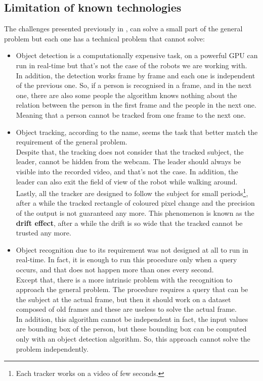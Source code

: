 \subsection{Limitation of known technologies}
The challenges presented previously in , can solve a small part of the general problem but each one has a technical problem that cannot solve:
\begin{itemize}
	\item Object detection is a computationally expensive task, on a powerful GPU can run in real-time but that's not the case of the robots we are working with.\\
	In addition, the detection works frame by frame and each one is independent of the previous one. So, if a person is recognised in a frame, and in the next one, there are also some people the algorithm knows nothing about the relation between the person in the first frame and the people in the next one. Meaning that a person cannot be tracked from one frame to the next one.

	\item Object tracking, according to the name, seems the task that better match the requirement of the general problem.\\
	Despite that, the tracking does not consider that the tracked subject, the leader, cannot be hidden from the webcam. The leader should always be visible into the recorded video, and that's not the case. In addition, the leader can also exit the field of view of the robot while walking around.\\
	Lastly, all the tracker are designed to follow the subject for small periods\footnote{Each tracker works on a video of few seconds.}, after a while the tracked rectangle of coloured pixel change and the precision of the output is not guaranteed any more. This phenomenon is known as the \textbf{drift effect}, after a while the drift is so wide that the tracked cannot be trusted any more.

	\item Object recognition due to its requirement was not designed at all to run in real-time. In fact, it is enough to run this procedure only when a query occurs, and that does not happen more than ones every second.\\
	Except that, there is a more intrinsic problem with the recognition to approach the general problem. The procedure requires a query that can be the subject at the actual frame, but then it should work on a dataset composed of old frames and these are useless to solve the actual frame.\\
	In addition, this algorithm cannot be independent in fact, the input values are bounding box of the person, but these bounding box can be computed only with an object detection algorithm. So, this approach cannot solve the problem independently.
\end{itemize}

